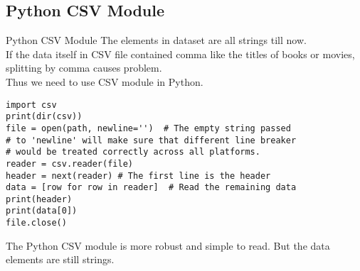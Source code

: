 \documentclass{beamer}
\begin{document}

\subsection{Python CSV Module}

\begin{frame}[fragile]{Python CSV Module} \vspace{1em}
\small{
The elements in dataset are all strings till now. \\
If the data itself in CSV file contained comma like the titles 
of books or movies, splitting by comma causes problem. \\
Thus we need to use CSV module in Python.} \vspace{-.5em}
\begin{verbatim}
import csv
print(dir(csv))
file = open(path, newline='')  # The empty string passed
# to 'newline' will make sure that different line breaker
# would be treated correctly across all platforms.
reader = csv.reader(file)
header = next(reader) # The first line is the header
data = [row for row in reader]  # Read the remaining data
print(header)
print(data[0])
file.close()
\end{verbatim}
The Python CSV module is more robust and simple to read. But 
the data elements are still strings.
\end{frame}
\end{document}
